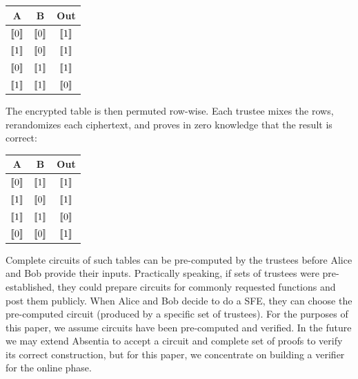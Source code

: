 \begin{center}
\begin{tabular}{|c|c|c|}
  \hline
  A			& 	B			& 	Out   			\\ \hline
  $\llbracket 0 \rrbracket$ 	&	$\llbracket 0 \rrbracket$ 	& 	$\llbracket 1 \rrbracket$ 	\\ \hline
  $\llbracket 1 \rrbracket$ 	&	$\llbracket 0 \rrbracket$ 	&  	$\llbracket 1 \rrbracket$ 	\\ \hline
  $\llbracket 0 \rrbracket$ 	&	$\llbracket 1 \rrbracket$ 	& 	$\llbracket 1 \rrbracket$ 	\\ \hline
  $\llbracket 1 \rrbracket$ 	&	$\llbracket 1 \rrbracket$ 	&  	$\llbracket 0 \rrbracket$ 	\\ \hline
\end{tabular}
\end{center}

The encrypted table is then permuted row-wise. Each trustee mixes the rows, rerandomizes each ciphertext, and proves in zero knowledge that the result is correct: 

\begin{center}
\begin{tabular}{|c|c|c|}
  \hline
  A			& 	B			& 	Out   			\\ \hline
  $\llbracket 0 \rrbracket$ 	&	$\llbracket 1 \rrbracket$ 	& 	$\llbracket 1 \rrbracket$ 	\\ \hline
  $\llbracket 1 \rrbracket$ 	&	$\llbracket 0 \rrbracket$ 	&  	$\llbracket 1 \rrbracket$ 	\\ \hline
  $\llbracket 1 \rrbracket$ 	&	$\llbracket 1 \rrbracket$ 	&  	$\llbracket 0 \rrbracket$ 	\\ \hline
  $\llbracket 0 \rrbracket$ 	&	$\llbracket 0 \rrbracket$ 	& 	$\llbracket 1 \rrbracket$ 	\\ \hline
\end{tabular}
\end{center}

Complete circuits of such tables can be pre-computed by the trustees before Alice and Bob provide their inputs. Practically speaking, if sets of trustees were pre-established, they could prepare circuits for commonly requested functions and post them publicly. When Alice and Bob decide to do a SFE, they can choose the pre-computed circuit (produced by a specific set of trustees). For the purposes of this paper, we assume circuits have been pre-computed and verified. In the future we may extend Absentia to accept a circuit and complete set of proofs to verify its correct construction, but for this paper, we concentrate on building a verifier for the online phase.

